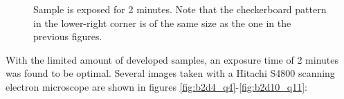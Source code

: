 \begin{figure}[H]
	\centering
	\caption{Sample is exposed for 2 minutes. Note that the checkerboard pattern in the lower-right corner is of the same size as the one in the previous figures.}
	\label{fig:b3a1}
\end{figure}

With the limited amount of developed samples, an exposure time of 2 minutes was found to be optimal. Several images taken with a Hitachi S4800 scanning electron microscope are shown in figures \ref{fig:b2d4_q4}-\ref{fig:b2d10_q11}:

